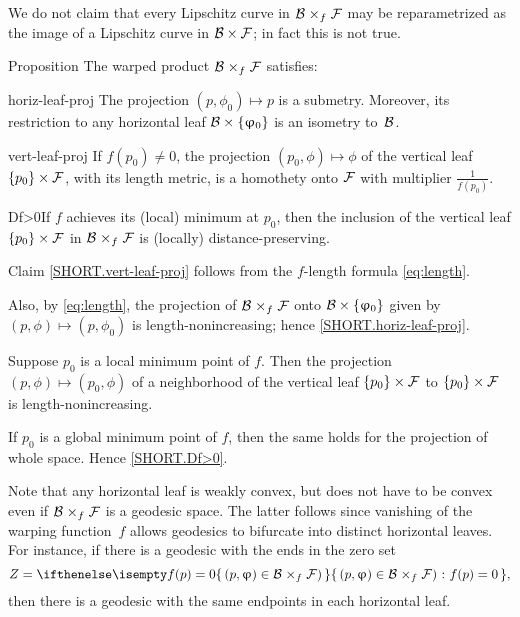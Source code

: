We do not claim that every Lipschitz curve in $\spc{B}\warp f \spc{F}$ may be reparametrized as the image of a Lipschitz curve in $\spc{B}\times \spc{F}$; in fact this is not true.

\begin{thm}{Proposition}
The warped product $\spc{\spc{B}}\warp{f}\spc{F}$ satisfies:

\begin{subthm}{horiz-leaf-proj}
The projection $(p,\phi_0)\mapsto p$ is a submetry.
Moreover, its restriction to any horizontal leaf $\spc{B}\times\{\phi_0\}$
is an isometry to~$\mathcal{B}$.
\end{subthm}

\begin{subthm}{vert-leaf-proj}
If $f(p_0)\ne0$, the projection $(p_0,\phi)\mapsto \phi$ of the vertical leaf $\{p_0\}\times \spc{F}$, with its length metric, is a homothety onto $\mathcal{F}$ with multiplier $\tfrac1{f(p_0)}$.
\end{subthm}

\begin{subthm}{Df>0}If $f$ achieves its (local) minimum at $p_0$, then the inclusion of the vertical leaf $\{p_0\} \times \spc{F}$ in $\spc{B}\warp{f}\spc{F}$ is (locally) distance-preserving.
\end{subthm}

\end{thm}


Claim \ref{SHORT.vert-leaf-proj} follows from the $f$-length formula \ref{eq:length}.

Also, by \ref{eq:length}, the projection of
$\spc{B}\warp{f}\spc{F}$ onto $\spc{B}\times\{\phi_0\}$ given by $(p,\phi)\mapsto (p,\phi_0)$ is length-nonincreasing; hence \ref{SHORT.horiz-leaf-proj}.

Suppose $p_0$ is a local minimum point of $f$.
Then the projection $(p,\phi)\mapsto (p_0,\phi)$ of a neighborhood of the vertical leaf $\{p_0\} \times \spc{F}$ to $\{p_0\} \times \spc{F}$ is length-nonincreasing.

If $p_0$ is a global minimum point of $f$, then the same holds for the projection of whole space.
Hence \ref{SHORT.Df>0}.
\qeds

Note that any horizontal leaf is weakly convex, but does not have to be convex even if $\spc{B}\warp{f}\spc{F}$ is a geodesic space.
The latter follows since vanishing of the warping function~$f$ allows geodesics to bifurcate into distinct horizontal leaves.
For instance, if there is a geodesic with the ends in the zero set 
\[Z=\set{(p,\phi)\in\spc{B} \warp{f}\spc{F})}{f(p)=0},\] 
then there is a geodesic with the same endpoints in each horizontal leaf.

